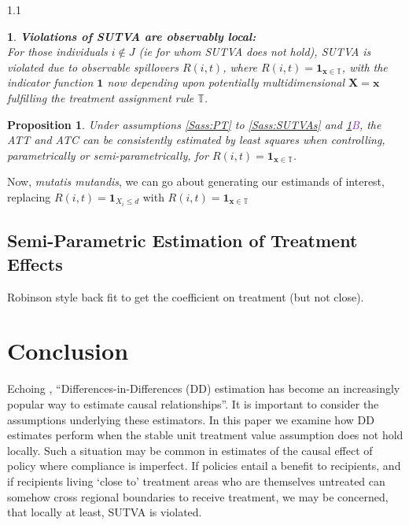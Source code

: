 \documentclass{article}
\makeatletter
\newtheorem{proposition}{Proposition}
\newtheorem*{assumption*}{\assumptionnumber}
\providecommand{\assumptionnumber}{}
\newenvironment{assumption}[2]
 {%
  \renewcommand{\assumptionnumber}{Assumption #1{#2}}%
  \begin{assumption*}%
  \protected@edef\@currentlabel{#1}%
 }
 {%
  \end{assumption*}
 }
\newcommand{\asref}[2]{\ref{#1}{\textcolor{BlueViolet}{#2}}}
\makeatother
\begin{document}
\begin{spacing}{1.1}
\begin{assumption}{4}{B}
\label{Sass:SUTVAlM}
\textbf{Violations of SUTVA are observably local:} \\ 
For those individuals $i\notin J$ (ie for whom SUTVA does not hold), SUTVA is
violated due to observable spillovers $R(i,t)$, where 
$R(i,t)=\mathbf{1}_{\mathbf{x}\in \mathbb{T}}$, with the indicator function 
$\mathbf{1}$ now depending upon potentially multidimensional
$\mathbf{X=x}$
fulfilling the treatment assignment rule $\mathbb{T}$.
\end{assumption}

\begin{proposition}
\label{Pass:ATTnonP}
Under assumptions \ref{Sass:PT} to \ref{Sass:SUTVAs} and
\asref{Sass:SUTVAlM}{B}, the ATT and ATC can be consistently estimated
by least squares when controlling, parametrically or
semi-parametrically, for $R(i,t)=\mathbf{1}_{\mathbf{x}\in
  \mathbb{T}}$. 
\end{proposition}

Now, \emph{mutatis mutandis}, we can go about generating our estimands of
interest, replacing $R(i,t)=\mathbf{1}_{X_i\leq d}$ with
$R(i,t)=\mathbf{1}_{\mathbf{x}\in \mathbb{T}}$


\subsection{Semi-Parametric Estimation of Treatment Effects}
Robinson style back fit to get the coefficient on treatment (but not close).
\citet{Imbens2004}



\section{Conclusion}
Echoing \citet{Bertrandetal2004}, ``Differences-in-Differences (DD) estimation 
has become an increasingly popular way to estimate causal relationships''.  
It is important to consider the assumptions underlying these estimators.  
In this paper we examine how DD estimates perform when the stable unit treatment 
value assumption does not hold locally.  Such a situation may be common in estimates 
of the causal effect of policy where compliance is imperfect.  If policies entail a 
benefit to recipients, and if recipients living `close to' treatment areas who are 
themselves untreated can somehow cross regional boundaries to receive treatment, we 
may be concerned, that locally at least, SUTVA is violated.


\end{spacing}
\end{document}
